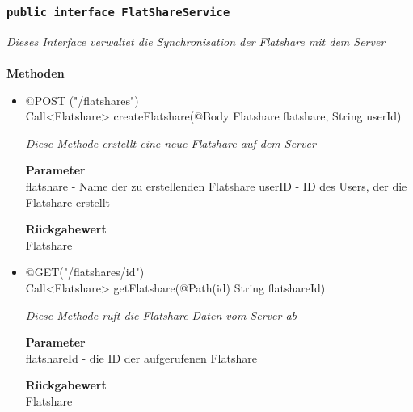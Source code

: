 	\subsubsection{\texttt{public interface FlatShareService }}
\textit{Dieses Interface verwaltet die Synchronisation der Flatshare mit dem Server}\\
\\
	\textbf{Methoden} \\
		\begin{itemize}
		\item{@POST ("/flatshares") \\
Call<Flatshare> createFlatshare(@Body Flatshare flatshare, String userId)
}

		\textit{Diese Methode erstellt eine neue Flatshare auf dem Server
}

		\textbf{Parameter} \\
	flatshare - Name der zu erstellenden Flatshare
	userID - ID des Users, der die Flatshare erstellt

		\textbf{Rückgabewert} \\
	Flatshare

      \item{@GET("/flatshares/{id}")\\ Call<Flatshare> getFlatshare(@Path(\grqq id\grqq) 					String flatshareId)}

		\textit{Diese Methode ruft die Flatshare-Daten vom Server ab}

		\textbf{Parameter} \\
		flatshareId - die ID der aufgerufenen Flatshare 

		\textbf{Rückgabewert} \\
	Flatshare


	 \end{itemize}



